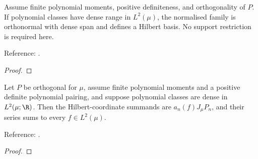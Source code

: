 \begin{theorem}
\label{thm:general-hilbert-basis}
\leanok
Assume finite polynomial moments, positive definiteness, and orthogonality of $P$.
If polynomial classes have dense range in $L^2(\mu)$, the normalised family is
orthonormal with dense span and defines a Hilbert basis. No support restriction
is required here.

Reference: \cite[18.2(viii)]{dlmf}.
\end{theorem}
\begin{proof}
\leanok
\end{proof}

\begin{theorem}
\label{thm:general-L2-expansion}
\leanok
Let $P$ be orthogonal for $\mu$, assume finite polynomial moments and a positive definite polynomial pairing, and suppose polynomial classes are dense in $L^2(\mu;\R)$. Then the Hilbert-coordinate summands are $a_n(f)J_\mu P_n$, and their series sums to every $f\in L^2(\mu)$.

Reference: \cite[18.2(viii)]{dlmf}.
\end{theorem}
\begin{proof}
\leanok
\end{proof}

